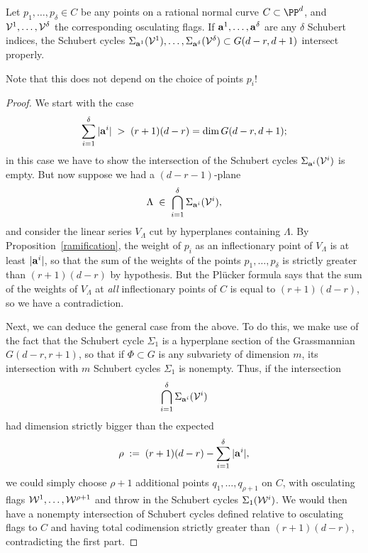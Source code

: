 \begin{theorem}\label{osculating intersection}
Let $p_1,\dots,p_\delta \in C$ be any points on a rational normal curve $C \subset \PP^d$, and ${\cal V}^1, \dots, {\cal V}^\delta$ the corresponding osculating flags. If ${\bf a}^1, \dots, {\bf a}^\delta$ are any $\delta$ Schubert indices, the Schubert cycles $\Sigma_{{\bf a}^1}({\cal V}^1), \dots, \Sigma_{{\bf a}^\delta}({\cal V}^\delta) \subset G(d-r, d+1)$ intersect properly.
\end{theorem}

Note that this does not depend on the choice of points $p_i$!

\begin{proof}
We start with the case
$$
\sum_{i=1}^\delta |{\bf a}^i| \; > \; (r+1)(d-r) = \dim G(d-r, d+1);
$$
in this case we have to show the intersection of the Schubert cycles $\Sigma_{{\bf a}^i}({\cal V}^i)$ is empty. But now suppose we had a $(d-r-1)$-plane 
$$
\Lambda \; \in \; \bigcap_{i=1}^\delta \Sigma_{{\bf a}^i}({\cal V}^i),
$$
and consider the linear series $V_\Lambda$ cut by hyperplanes containing $\Lambda$. By Proposition~\ref{ramification}, the weight of $p_i$ as an inflectionary point of $V_\Lambda$ is at least $|{\bf a}^i|$, so that the sum of the weights of the points $p_1,\dots,p_\delta$ is strictly greater than $(r+1)(d-r)$ by hypothesis. But the Pl\"ucker formula says that the sum of the weights of $V_\Lambda$ at \emph{all} inflectionary points of $C$ is equal to  $(r+1)(d-r)$, so we have a contradiction.

Next, we can deduce the general case from the above. To do this, we make use of the fact that the Schubert cycle $\Sigma_1$ is a hyperplane section of the Grassmannian $G(d-r, r+1)$, so that if $\Phi \subset G$ is any subvariety of dimension $m$, its intersection with $m$ Schubert cycles $\Sigma_1$ is nonempty. Thus, if the intersection
$$
\bigcap_{i=1}^\delta \Sigma_{{\bf a}^i}({\cal V}^i)
$$
had dimension strictly bigger than the expected
$$
\rho \; := \; (r+1)(d-r) - \sum_{i=1}^\delta |{\bf a}^i|,
$$
we could simply choose $\rho + 1$ additional points $q_1,\dots,q_{\rho + 1}$ on $C$, with osculating flags ${\cal W}^1, \dots, {\cal W}^{\rho + 1}$ and throw in the Schubert cycles $\Sigma_1({\cal W}^i)$. We would then have a nonempty intersection of Schubert cycles defined relative to osculating flags to $C$ and having total codimension strictly greater than $(r+1)(d-r)$, contradicting the first part.
\end{proof}

